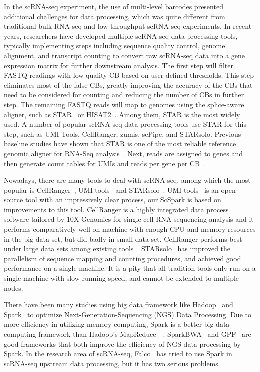 \documentclass[runningheads]{llncs}
\begin{document}
In the scRNA-seq experiment, the use of multi-level barcodes presented additional challenges for data processing, which was quite different from traditional bulk RNA-seq and low-throughput scRNA-seq experiments.
In recent years, researchers have developed multiple scRNA-seq data processing tools, typically implementing steps including sequence quality control, genome alignment, and transcript counting to convert raw scRNA-seq data into a gene expression matrix for further downstream analysis.
The first step will filter FASTQ readings with low quality CB based on user-defined thresholds.
This step eliminates most of the false CBs, greatly improving the accuracy of the CBs that need to be considered for counting and reducing the number of CBs in further step.
The remaining FASTQ reads will map to genomes using the splice-aware aligner, such as STAR~\cite{dobin2012RNA} or HISAT2~\cite{kim2015hisat}.
Among them, STAR is the most widely used. A number of popular scRNA-seq data processing tools use STAR for this step, such as UMI-Tools, CellRanger, zumis, scPipe, and STARsolo.
Previous baseline studies have shown that STAR is one of the most reliable reference genomic aligner for RNA-Seq analysis~\cite{Baruzzo2017SimulationbasedCB}.
Next, reads are assigned to genes and then generate count tables for UMIs and reads per gene per CB~\cite{swati0zUMIs}.

Nowadays, there are many tools to deal with scRNA-seq, among which the most popular is CellRanger~\cite{zheng2017Massively}, UMI-tools~\cite{Smith2017UMItoolsMS} and STARsolo~\cite{2019STARsolo}. 
UMI-tools~\cite{ref_url1} is an open source tool with an impressively clear process, our ScSpark is based on improvements to this tool.
CellRanger is a highly integrated data process software tailored by 10X Genomics for single-cell RNA sequencing analysis and it performs comparatively well on machine with enough CPU and memory resources in the big data set, but did badly in small data set. CellRanger performs best under large data sets among existing tools~\cite{gao2020Comparison}.
STARsolo~\cite{2019STARsolo} has improved the parallelism of sequence mapping and counting procedures, and achieved good performance on a single machine.
It is a pity that all tradition tools only run on a single machine with slow running speed, and cannot be extended to multiple nodes.

There have been many studies using big data framework like 
                                                           Hadoop~\cite{ref_url2}
                                                                                  and Spark~\cite{ref_url3} to optimize Next-Generation-Sequencing (NGS) Data Processing.
Due to more efficiency in utilizing memory computing, Spark is a better big data computing framework than Hadoop's MapReduce~\cite{dean2008mapreduce}~\cite{zaharia2012resilient}.
SparkBWA~\cite{abuin2016sparkbwa} and GPF~\cite{li2018high} are good frameworks that both improve the efficiency of NGS data processing by Spark.
In the research area of scRNA-seq, Falco~\cite{Yang2016Falco} has tried to use Spark in scRNA-seq upstream data processing, but it has two serious problems.
\end{document}
